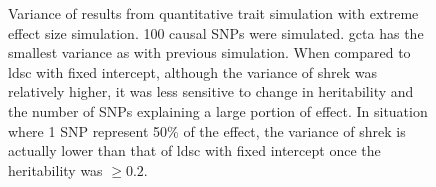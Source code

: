 \begin{figure}
{				
				\label{fig:ldscInQtEx100cVar}
			}
			\caption[Quantitative Trait with Extreme Effect Size Simulation Result(100 causal SNPs, Variance)]
			{Variance of results from quantitative trait simulation with extreme effect size simulation.
				100 causal \glspl{SNP} were simulated.
				\gls{gcta} has the smallest variance as with previous simulation.
				When compared to \gls{ldsc} with fixed intercept, although the variance of \gls{shrek} was relatively higher, it was less sensitive to change in heritability and the number of \glspl{SNP} explaining a large portion of effect.
				In situation where 1 \gls{SNP} represent 50\% of the effect, the variance of \gls{shrek} is actually lower than that of \gls{ldsc} with fixed intercept once the heritability was $\ge0.2$.
			} 
			\label{fig:QtEx100cVar}
		\end{figure}
		
